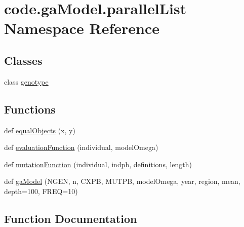 \hypertarget{namespacecode_1_1ga_model_1_1parallel_list}{}\section{code.\+ga\+Model.\+parallel\+List Namespace Reference}
\label{namespacecode_1_1ga_model_1_1parallel_list}
\subsection*{Classes}
\begin{DoxyCompactItemize}
\item 
class \hyperlink{classcode_1_1ga_model_1_1parallel_list_1_1genotype}{genotype}
\end{DoxyCompactItemize}
\subsection*{Functions}
\begin{DoxyCompactItemize}
\item 
def \hyperlink{namespacecode_1_1ga_model_1_1parallel_list_a56c838f0ac5cda7811a2ccb7f1ff0a3b}{equal\+Objects} (x, y)
\item 
def \hyperlink{namespacecode_1_1ga_model_1_1parallel_list_a81a9ac8cf875307d1e367fb559d57ec0}{evaluation\+Function} (individual, model\+Omega)
\item 
def \hyperlink{namespacecode_1_1ga_model_1_1parallel_list_a89410c99c222011f45e18b728f2f1d7e}{mutation\+Function} (individual, indpb, definitions, length)
\item 
def \hyperlink{namespacecode_1_1ga_model_1_1parallel_list_a56992cede06ab5b5142f054b0a6a04dd}{ga\+Model} (N\+G\+EN, n, C\+X\+PB, M\+U\+T\+PB, model\+Omega, year, region, mean, depth=100, F\+R\+EQ=10)
\end{DoxyCompactItemize}


\subsection{Function Documentation}
\mbox{\label{namespacecode_1_1ga_model_1_1parallel_list_a56c838f0ac5cda7811a2ccb7f1ff0a3b}} 
